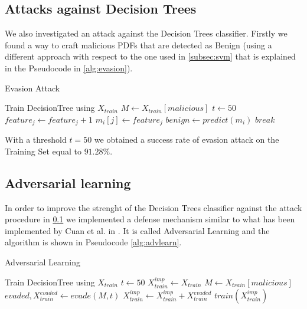 \documentclass[twocolumn, switch]{article} %
\begin{document}
\subsection{Attacks against Decision Trees}
\label{subsec:tree}
We also investigated an attack against the Decision Trees classifier. Firstly we found a way to craft malicious PDFs that are detected as Benign (using a different approach with respect to the one used in \ref{subsec:svm} that is explained in the Pseudocode in \ref{alg:evasion}).
\begin{algorithm}
	{\footnotesize
		\caption{Evasion Attack}\label{alg:evasion}
		\begin{algorithmic}
			\Require Train DecisionTree using $X_{train}$
			\State $M \gets X_{train}[malicious]$
			\State $t \gets 50$
			\State $feature_j \gets feature_j + 1$
			\State $m_i[j] \gets feature_j$
			\State $benign \gets predict(m_i)$
			\State $break$  
			\EndIf
			\EndWhile
			\EndFor
			\EndFor
		\end{algorithmic}
	}
\end{algorithm}

With a threshold $t=50$ we obtained a success rate of evasion attack on the Training Set equal to $91.28\%$.

\subsection{Adversarial learning}
In order to improve the strenght of the Decision Trees classifier against the attack procedure in \ref{subsec:tree} we implemented a defense mechanism similar to what has been implemented by Cuan et al. in \cite{cuan_damien_delaplace_valois_2018}.
It is called Adversarial Learning and the algorithm is shown in Pseudocode \ref{alg:advlearn}.

\begin{algorithm}
	{\footnotesize
		\caption{Adversarial Learning}\label{alg:advlearn}
		\begin{algorithmic}
			\Require Train DecisionTree using $X_{train}$
			\State $t \gets 50$
			\State $X_{train}^{imp} \gets X_{train}$
			\State $M \gets X_{train}[malicious]$
			\While{$\#PDF evaded > 0$}
			\State $evaded,X_{train}^{evaded} \gets evade(M,t)$
			\If{$evaded$ is $True$}
			\State $X_{train}^{imp} \gets X_{train}^{imp} + X_{train}^{evaded}$
			\EndIf
			\State $train(X_{train}^{imp})$
			\EndWhile
		\end{algorithmic}
	}
\end{algorithm}
\end{document}

